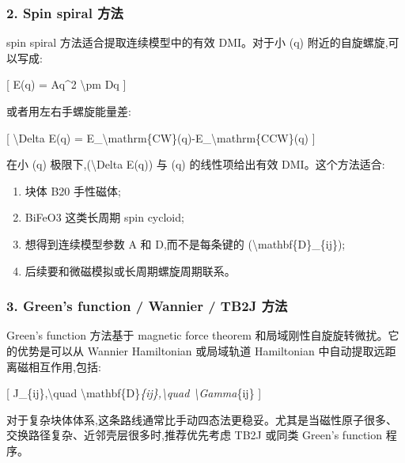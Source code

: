 \documentclass[lang=cn,scheme=chinese,color=blue,device=normal,toc=onecol,math=cm]{elegantbook}
\begin{document}
\subsubsection{2. Spin spiral 方法}


spin spiral 方法适合提取连续模型中的有效 DMI。对于小 (q) 附近的自旋螺旋,可以写成:\par


[ E(q) = Aq\textasciicircum{}2 \textbackslash{}\allowbreak{}pm Dq ]\par


或者用左右手螺旋能量差:\par


[ \textbackslash{}\allowbreak{}Delta E(q) = E\_\allowbreak{}\textbackslash{}\allowbreak{}mathrm\{CW\}(q)-E\_\allowbreak{}\textbackslash{}\allowbreak{}mathrm\{CCW\}(q) ]\par


在小 (q) 极限下,(\textbackslash{}\allowbreak{}Delta E(q)) 与 (q) 的线性项给出有效 DMI。这个方法适合:\par


\begin{enumerate}
\item 块体 B20 手性磁体;
\item BiFeO3 这类长周期 spin cycloid;
\item 想得到连续模型参数 A 和 D,而不是每条键的 (\textbackslash{}\allowbreak{}mathbf\{D\}\_\allowbreak{}\{ij\});
\item 后续要和微磁模拟或长周期螺旋周期联系。
\end{enumerate}


\subsubsection{3. Green’s function /\allowbreak{} Wannier /\allowbreak{} TB2J 方法}


Green’s function 方法基于 magnetic force theorem 和局域刚性自旋旋转微扰。它的优势是可以从 Wannier Hamiltonian 或局域轨道 Hamiltonian 中自动提取远距离磁相互作用,包括:\par


[ J\_\allowbreak{}\{ij\},\textbackslash{}\allowbreak{}quad \textbackslash{}\allowbreak{}mathbf\{D\}\emph{\{ij\},\textbackslash{}\allowbreak{}quad \textbackslash{}\allowbreak{}Gamma}\{ij\} ]\par


对于复杂块体体系,这条路线通常比手动四态法更稳妥。尤其是当磁性原子很多、交换路径复杂、近邻壳层很多时,推荐优先考虑 TB2J 或同类 Green’s function 程序。\par
\end{document}
